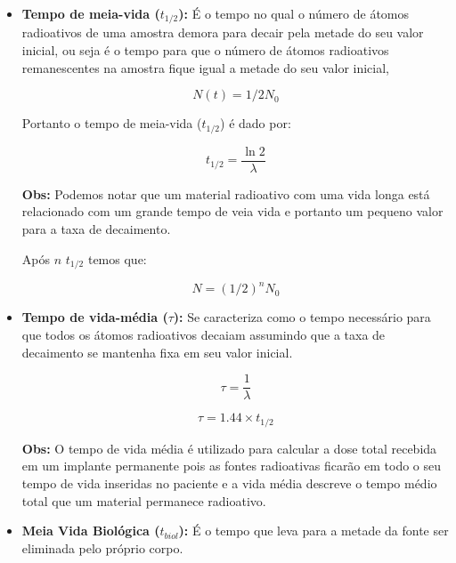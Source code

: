 \documentclass[11pt,a4paper]{article}
\begin{document}
\begin{itemize}
			\item \textbf{Tempo de meia-vida ($t_{1/2}$): } É o tempo no qual o número de átomos radioativos de uma amostra demora para decair pela metade do seu valor inicial, ou seja é o tempo para que o número de átomos radioativos remanescentes na amostra fique igual a metade do seu valor inicial, 
			
				\begin{equation}
					N(t) = {1/2}N_0
				\end{equation}

				Portanto o tempo de meia-vida  ($t_{1/2}$) é dado por:

				\begin{equation}
					t_{1/2} = \frac{\ln 2}{\lambda}
				\end{equation}

				\textbf{\textcolor{CarnationPink}{Obs:} } Podemos notar que um material radioativo com uma vida longa está relacionado com um grande tempo de veia vida e portanto um pequeno valor para a taxa de decaimento.

				Após $n$ $t_{1/2}$ temos que:

				\begin{equation}
					N = \left({1/2}\right)^n N_0
				\end{equation}



			\item \textbf{Tempo de vida-média ($\tau$): } Se caracteriza como o tempo necessário para que todos os átomos radioativos decaiam assumindo que a taxa de decaimento se mantenha fixa em seu valor inicial.
			
				\begin{equation}
					\tau = \frac{1}{\lambda}
				\end{equation}

				\begin{equation}
					\tau = 1.44 \times t_{1/2}
				\end{equation}

				\textbf{\textcolor{CarnationPink}{Obs:} } O tempo de vida média é utilizado para calcular a dose total recebida em um implante permanente pois as fontes radioativas ficarão em todo o seu tempo de vida inseridas no paciente e a vida média descreve o tempo médio total que um material permanece radioativo.

			\item \textbf{Meia Vida Biológica ($t_{biol}$): } É o tempo que leva para a metade da fonte ser eliminada pelo próprio corpo.
			

\end{itemize}
\end{document}
